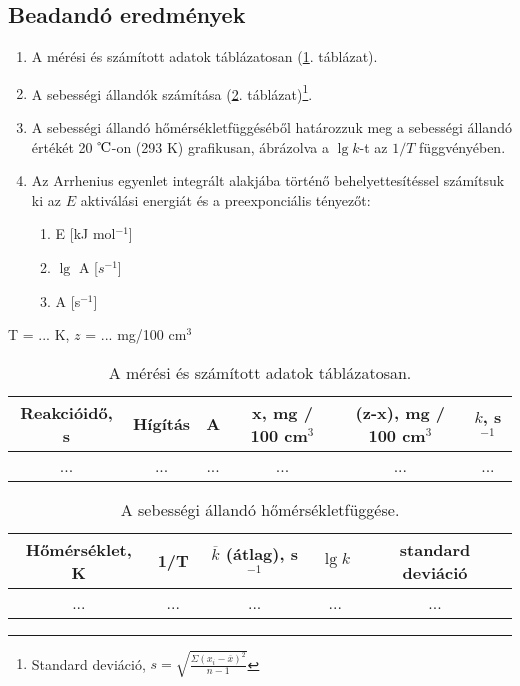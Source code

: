 \documentclass[a4paper, 12pt, twoside]{article}
\begin{document}
\subsection{Beadandó eredmények}

\begin{enumerate}
\item A mérési és számított adatok táblázatosan (\ref{table:tablazatos}. táblázat).
\item A sebességi állandók számítása (\ref{table:seb}. táblázat)\footnote{Standard deviáció, $s=\sqrt{\frac{\Sigma(x_i-\overline{x})^2}{n-1}}$}.
\item A sebességi állandó hőmérsékletfüggéséből határozzuk meg a sebességi állandó értékét 20 $\celsius$-on (293 K) grafikusan, ábrázolva a $\lg k$-t az $1/T$ függvényében.
\item Az Arrhenius egyenlet integrált alakjába történő behelyettesítéssel számítsuk ki az $E$ aktiválási energiát és a preexponciális tényezőt:
	\begin{enumerate}
		\item E [kJ mol$^{-1}$]
		\item $\lg$ A [$s^{-1}$]
		\item A [s$^{-1}$]
	\end{enumerate}
\end{enumerate}

\begin{table}[!h]
\caption{A mérési és számított adatok táblázatosan.}
\centering
T = ... K, $z$ = ... mg/100 cm$^3$
\begin{tabular}{|c|c|c|c|c|c|}
\hline
Reakcióidő, s&Hígítás&A&x, mg / 100 cm$^3$ &(z-x), mg / 100 cm$^3$ & $k$, s$^{-1}$ \\
\hline
... & ... & ... & ... & ... & ... \\
\end{tabular}
\label{table:tablazatos}
\end{table}

\begin{table}[!h]
\caption{A sebességi állandó hőmérsékletfüggése.}
\centering
\begin{tabular}{|c|c|c|c|c|}
\hline
Hőmérséklet, K& 1/T & $\overline{k}$ (átlag), s$^{-1}$ & $\lg k$ & standard deviáció \\
\hline
... & ... & ... & ... & ... \\
\end{tabular}
\label{table:seb}
\end{table}
\end{document}
